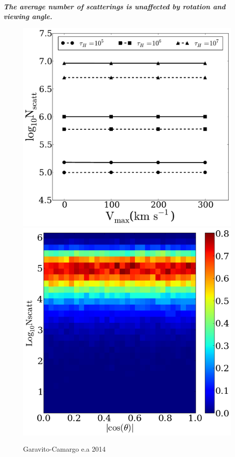 \documentclass{beamer}
\begin{document}
\begin{frame}{\textit{\textbf{The average number of scatterings is unaffected by rotation and viewing angle.}}}
\begin{figure}
\includegraphics[scale=0.25]{Figures/f13.pdf}
\includegraphics[scale=0.25]{Figures/f9h.png}
\caption*{Garavito-Camargo e.a 2014}
\end{figure}
\end{frame}
\end{document}
